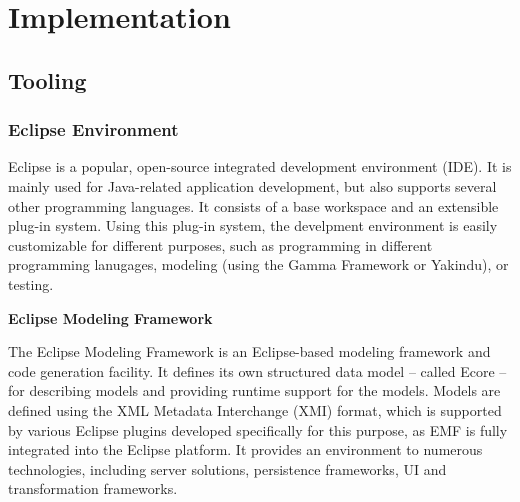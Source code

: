 \chapter{Implementation}

\section{Tooling} \label{sec_tooling}

\subsection{Eclipse Environment} \label{subsec_emf}
Eclipse is a popular, open-source integrated development environment (IDE). It is mainly used for Java-related application development, but also supports several other programming languages. It consists of a base workspace and an extensible plug-in system. Using this plug-in system, the develpment environment is easily customizable for different purposes, such as programming in different programming lanugages, modeling (using the Gamma Framework or Yakindu), or testing.

\textbf{Eclipse Modeling Framework}

The Eclipse Modeling Framework is an Eclipse-based modeling framework and code generation facility. It defines its own structured data model -- called Ecore -- for describing models and providing runtime support for the models. Models are defined using the XML Metadata Interchange (XMI) format, which is supported by various Eclipse plugins developed specifically for this purpose, as EMF is fully integrated into the Eclipse platform. It provides an environment to numerous technologies, including server solutions, persistence frameworks, UI and transformation frameworks.

